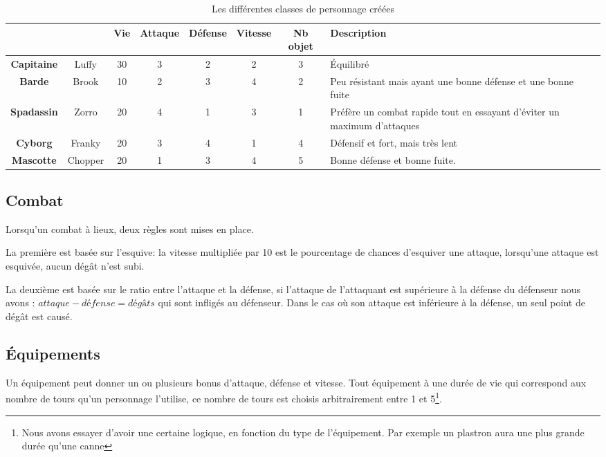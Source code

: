 \documentclass[12pt,a4paper,openany]{book}
\begin{document}
	 \begin{table}[H]
		 \centering
		 \normalsize
	 \begin{tabular}{cc|cccccp{5.0cm}}
			&&Vie& Attaque & Défense & Vitesse & Nb objet&Description\\
			\hline
			\textbf{Capitaine} & Luffy & 30 & 3 & 2 & 2 & 3& \footnotesize Équilibré\\
			\hline
			\textbf{Barde} & Brook & 10 & 2 & 3 & 4 & 2& \footnotesize Peu résistant mais ayant une bonne défense et une bonne fuite\\
			\hline
			\textbf{Spadassin} & Zorro & 20 & 4 & 1& 3&1& \footnotesize Préfère un combat rapide tout en essayant d'éviter un maximum d'attaques\\
			\hline
			\textbf{Cyborg} & Franky & 20 & 3 & 4 & 1& 4 & \footnotesize Défensif et fort, mais très lent\\
			\hline
			\textbf{Mascotte} & Chopper&20&1&3&4&5& \footnotesize Bonne défense et bonne fuite. \\
			\hline
		\end{tabular}
		\caption{Les différentes classes de personnage créées}
	\end{table}

\subsection{Combat}
Lorsqu'un combat à lieux, deux règles sont mises en place.

La première est basée sur l'esquive: la vitesse multipliée par 10 est le pourcentage de chances d’esquiver une attaque, lorsqu'une attaque est esquivée, aucun
dégât n'est subi. 

La deuxième est basée sur le ratio entre l'attaque et la défense, si l'attaque de l'attaquant est supérieure à la défense du défenseur nous avons : $attaque
- défense =  dégâts$ qui sont infligés au défenseur. Dans le cas où son attaque est inférieure à la défense, un seul point de dégât est causé.

	\subsection{Équipements}
	 Un équipement peut donner un ou plusieurs bonus d'attaque, défense et vitesse. Tout équipement à une durée de vie qui correspond aux nombre de tours qu'un
	 personnage l'utilise, ce nombre de tours est choisis arbitrairement entre 1 et 5\footnote{Nous avons essayer d'avoir une certaine logique, en fonction du
	 type de l'équipement. Par exemple un plastron aura une plus grande durée qu'une canne}.
\end{document}
